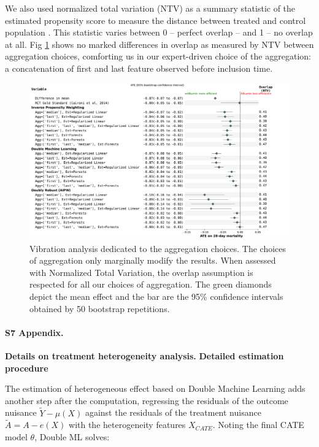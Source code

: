 \documentclass[10pt,letterpaper]{article}
\begin{document}
We also used normalized total variation (NTV) as a summary statistic of the
estimated propensity score to measure the distance between treated and control
population \cite{doutreligne2023select}. This statistic varies between 0 --
perfect overlap -- and 1 -- no overlap at all. Fig
\ref{apd:fig:albumin_for_sepsis:vibration_analysis_for_aggregation} shows no
marked differences in overlap as measured by NTV between aggregation choices,
comforting us in our expert-driven choice of the aggregation: a concatenation
of first and last feature observed before inclusion time.

\begin{figure}[h!]
  \centering
  \includegraphics[width=1.0\linewidth]{img_supp/sensitivity_feature_aggregation_albumin_for_sepsis__bs_50.pdf}
  \caption{Vibration analysis dedicated to the aggregation choices. The
    choices of aggregation only marginally modify the results. When assessed
    with Normalized Total Variation, the overlap assumption is respected for all
    our choices of aggregation. The green diamonds depict the mean effect and
    the bar are the 95\% confidence intervals obtained by 50 bootstrap
    repetitions.}\label{apd:fig:albumin_for_sepsis:vibration_analysis_for_aggregation}
\end{figure}
\clearpage


\paragraph*{S7 Appendix.}
\label{apd:hte}
{\bf Details on treatment heterogeneity analysis.}
\textbf{Detailed estimation procedure}

The estimation of heterogeneous effect based on Double Machine Learning adds
another step after the computation, regressing the residuals of the outcome
nuisance $\tilde{Y} - \mu(X)$ against the residuals of the treatment nuisance
$\tilde{A} = A - e(X)$ with the heterogeneity features $X_{CATE}$. Noting the
final CATE model $\theta$, Double ML solves:
\end{document}
